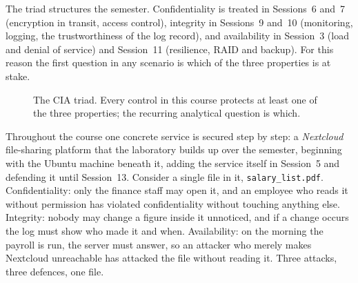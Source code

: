 The triad structures the semester. Confidentiality is treated in Sessions~6
and~7 (encryption in transit, access control), integrity in Sessions~9
and~10 (monitoring, logging, the trustworthiness of the log record), and
availability in Session~3 (load and denial of service) and Session~11
(resilience, RAID and backup). For this reason the first question in any
scenario is which of the three properties is at stake.

\begin{figure}[htbp]
\centering
{}
\caption{The CIA triad. Every control in this course protects at least one of
the three properties; the recurring analytical question is which.}
\label{fig:cia}
\end{figure}

\begin{example}\label{ex:nextcloud-cia}
Throughout the course one concrete service is secured step by step: a
\emph{Nextcloud} file-sharing platform that the laboratory builds up over the
semester, beginning with the Ubuntu machine beneath it, adding the service
itself in Session~5 and defending it until Session~13. Consider a single file
in it, \texttt{salary\_list.pdf}. Confidentiality: only the finance staff may
open it, and an employee who reads it without permission has violated
confidentiality without touching anything else. Integrity: nobody may change
a figure inside it unnoticed, and if a change occurs the log must show who
made it and when. Availability: on the morning the payroll is run, the
server must answer, so an attacker who merely makes Nextcloud unreachable
has attacked the file without reading it.
Three attacks, three defences, one file.
\end{example}

